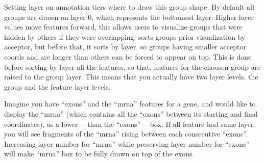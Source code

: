 %
%
%
%
   { {\tbdef} }
%
   { {\tbdef} }
%
   { {\tbdef} }
%
   { {\tbdef} }
%
   { {\tbdef} }
%
   { {\tbdef} }
%
   { Setting layer on annotation tiers where to draw this group shape. By default all groups are drawn on layer 0, which represents the bottomest layer. Higher layer values move features forward, this allows users to visualize groups that were hidden by others if they were overlapping. {\prog} sorts groups prior visualization by acceptor, but before that, it sorts by layer, so groups having smaller acceptor coords and are longer than others can be forced to appear on top. This is done before sorting by layer all the features, so that, features for the choosen group are raised to the group layer. This means that you actually have two layer levels, the group and the feature layer levels. 
 
 Imagine you have ``exons'' and the ``mrna'' features for a gene, and would like to display the ``mrna'' (which contains all the ``exons'' between its starting and final coordinates), as a lower ---than the ``exons''--- box. If all feature had same layer you will see fragments of the ``mrna'' rising between each consecutive ``exons''. Increasing layer number for ``mrna'' while preserving layer number for ``exons'' will make ``mrna'' box to be fully drawn on top of the exons. }
%
   { {\tbdef} }
%
   { {\tbdef} }
%
